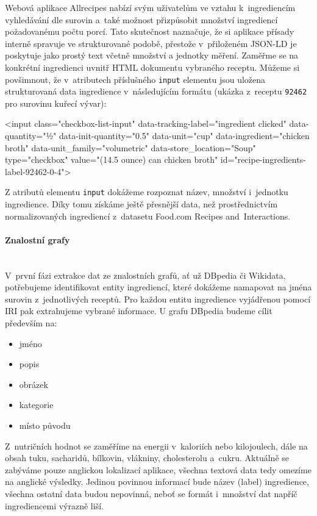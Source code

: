 Webová aplikace Allrecipes nabízí svým uživatelům ve vztahu k~ingrediencím vyhledávání dle surovin a~také možnost přizpůsobit množství ingrediencí požadovanému počtu porcí. Tato skutečnost naznačuje, že si aplikace přísady interně spravuje ve strukturované podobě, přestože v~přiloženém JSON-LD je poskytuje jako prostý text včetně množství a jednotky měření. Zaměřme se na konkrétní ingredienci uvnitř HTML dokumentu vybraného receptu. Můžeme si povšimnout, že v~atributech příslušného \texttt{input} elementu jsou uložena strukturovaná data ingredience v~následujícím formátu (ukázka z~receptu \texttt{92462} pro surovinu kuřecí vývar):

\begin{code}
<input
    class="checkbox-list-input"
    data-tracking-label="ingredient clicked"
    data-quantity="½"
    data-init-quantity="0.5"
    data-unit="cup"
    data-ingredient="chicken broth"
    data-unit_family="volumetric"
    data-store_location="Soup"
    type="checkbox"
    value="(14.5 ounce) can chicken broth"
    id="recipe-ingredients-label-92462-0-4">
\end{code}

Z atributů elementu \texttt{input} dokážeme rozpoznat název, množství i~jednotku ingredience. Díky tomu získáme ještě přesnější data, než prostřednictvím normalizovaných ingrediencí z~datasetu Food.com Recipes and~Interactions.

\paragraph{Znalostní grafy}\mbox{}\\

V~první fázi extrakce dat ze znalostních grafů, ať už DBpedia či Wikidata, potřebujeme identifikovat entity ingrediencí, které dokážeme namapovat na jména surovin z~jednotlivých receptů. Pro každou entitu ingredience vyjádřenou pomocí IRI pak extrahujeme vybrané informace. U grafu DBpedia budeme cílit především na:
\begin{itemize}
    \item jméno
    \item popis
    \item obrázek
    \item kategorie
    \item místo původu
\end{itemize}

Z~nutričních hodnot se zaměříme na energii v~kaloriích nebo kilojoulech, dále na obsah tuku, sacharidů, bílkovin, vlákniny, cholesterolu a~cukru. Aktuálně se zabýváme pouze anglickou lokalizací aplikace, všechna textová data tedy omezíme na anglické výsledky. Jedinou povinnou informací bude název (label) ingredience, všechna ostatní data budou nepovinná, neboť se formát i~množství dat napříč ingrediencemi výrazně liší.

